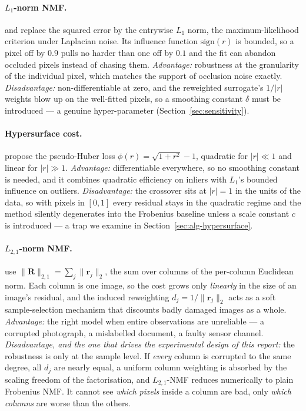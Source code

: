 \documentclass[12pt,a4paper]{article}
\newcommand{\bR}{\bm{R}}
\newcommand{\br}{\bm{r}}
\begin{document}
\paragraph{$L_1$-norm NMF.}
\citet{ke2005robust} and \citet{ding2006orthogonal} replace the squared error by
the entrywise $L_1$ norm, the maximum-likelihood criterion under Laplacian
noise. Its influence function $\mathrm{sign}(r)$ is bounded, so a pixel off by
$0.9$ pulls no harder than one off by $0.1$ and the fit can abandon occluded
pixels instead of chasing them.
\emph{Advantage:} robustness at the granularity of the individual pixel, which
matches the support of occlusion noise exactly.
\emph{Disadvantage:} non-differentiable at zero, and the reweighted surrogate's
$1/|r|$ weights blow up on the well-fitted pixels, so a smoothing constant
$\delta$ must be introduced --- a genuine hyper-parameter
(Section~\ref{sec:sensitivity}).

\paragraph{Hypersurface cost.}
\citet{hamza2006reconstruction} propose the pseudo-Huber loss
$\phi(r) = \sqrt{1 + r^{2}} - 1$, quadratic for $|r| \ll 1$ and linear for
$|r| \gg 1$.
\emph{Advantage:} differentiable everywhere, so no smoothing constant is
needed, and it combines quadratic efficiency on inliers with $L_1$'s bounded
influence on outliers.
\emph{Disadvantage:} the crossover sits at $|r| = 1$ in the units of the data,
so with pixels in $[0,1]$ every residual stays in the quadratic regime and the
method silently degenerates into the Frobenius baseline unless a scale constant
$c$ is introduced --- a trap we examine in
Section~\ref{sec:alg-hypersurface}.

\paragraph{$L_{2,1}$-norm NMF.}
\citet{kong2011robust} use $\|\bR\|_{2,1} = \sum_{j} \|\br_j\|_2$, the sum over
columns of the per-column Euclidean norm. Each column is one image, so the
cost grows only \emph{linearly} in the size of an image's residual, and the
induced reweighting $d_j = 1/\|\br_j\|_2$ acts as a soft sample-selection
mechanism that discounts badly damaged images as a whole.
\emph{Advantage:} the right model when entire observations are unreliable ---
a corrupted photograph, a mislabelled document, a faulty sensor channel.
\emph{Disadvantage, and the one that drives the experimental design of this
report:} the robustness is only at the sample level. If \emph{every} column is
corrupted to the same degree, all $d_j$ are nearly equal, a uniform column
weighting is absorbed by the scaling freedom of the factorisation, and
$L_{2,1}$-NMF reduces numerically to plain Frobenius NMF. It cannot see
\emph{which pixels} inside a column are bad, only \emph{which columns} are
worse than the others.
\end{document}
